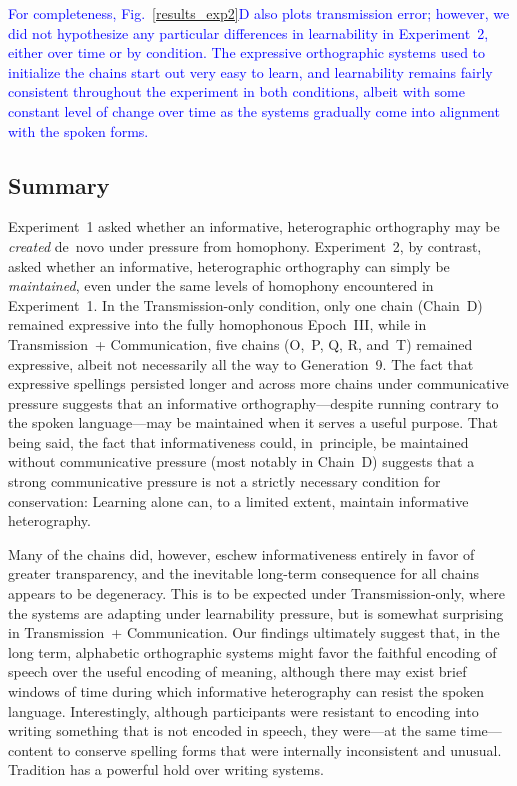 \documentclass[doc,biblatex]{apa7}
\newcommand\newmaterial[1]{\textcolor{blue}{#1}}
\begin{document}
\newmaterial{For completeness, Fig.~\ref{results_exp2}D also plots transmission error; however, we did not hypothesize any particular differences in learnability in Experiment~2, either over time or by condition. The expressive orthographic systems used to initialize the chains start out very easy to learn, and learnability remains fairly consistent throughout the experiment in both conditions, albeit with some constant level of change over time as the systems gradually come into alignment with the spoken forms.}

\subsection{Summary}

Experiment~1 asked whether an informative, heterographic orthography may be \textit{created} de~novo under pressure from homophony. Experiment~2, by contrast, asked whether an informative, heterographic orthography can simply be \textit{maintained}, even under the same levels of homophony encountered in Experiment~1. In the Transmission-only condition, only one chain (Chain~D) remained expressive into the fully homophonous Epoch~III, while in Transmission~+ Communication, five chains (O,~P, Q, R, and~T) remained expressive, albeit not necessarily all the way to Generation~9. The fact that expressive spellings persisted longer and across more chains under communicative pressure suggests that an informative orthography---despite running contrary to the spoken language---may be maintained when it serves a useful purpose. That being said, the fact that informativeness could, in~principle, be maintained without communicative pressure (most notably in Chain~D) suggests that a strong communicative pressure is not a strictly necessary condition for conservation: Learning alone can, to a limited extent, maintain informative heterography.

Many of the chains did, however, eschew informativeness entirely in favor of greater transparency, and the inevitable long-term consequence for all chains appears to be degeneracy. This is to be expected under Transmission-only, where the systems are adapting under learnability pressure, but is somewhat surprising in Transmission~+ Communication. Our findings ultimately suggest that, in the long term, alphabetic orthographic systems might favor the faithful encoding of speech over the useful encoding of meaning, although there may exist brief windows of time during which informative heterography can resist the spoken language. Interestingly, although participants were resistant to encoding into writing something that is not encoded in speech, they were---at the same time---content to conserve spelling forms that were internally inconsistent and unusual. Tradition has a powerful hold over writing systems.
\end{document}

